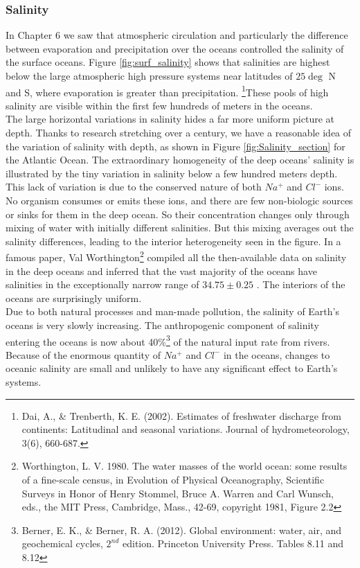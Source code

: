 \subsubsection{Salinity}
In Chapter 6 we saw that atmospheric circulation and particularly the difference between evaporation and precipitation over the oceans controlled the salinity of the surface oceans. Figure \ref{fig:surf_salinity}
shows that salinities are highest below the large atmospheric high pressure systems near latitudes of $25 \deg$ N and S, where evaporation is greater than precipitation. \footnote{Dai, A., \& Trenberth, K. E. (2002). Estimates of freshwater discharge from continents: Latitudinal and seasonal variations. Journal of hydrometeorology, 3(6), 660-687.}These pools of high salinity are visible within the first few hundreds of meters in the oceans.\\
The large horizontal variations in salinity hides a far more uniform picture at depth. Thanks to research stretching over a century, we have a reasonable idea of the variation of salinity with depth, as shown in Figure \ref{fig:Salinity_section} for the Atlantic Ocean. The extraordinary homogeneity of the deep oceans' salinity is illustrated by the tiny variation in salinity below a few hundred meters depth. This lack of variation is due to the conserved nature of both $Na^+$ and $Cl^-$ ions. No organism consumes or emits these ions, and there are few non-biologic sources or sinks for them in the deep ocean. So their concentration changes only through mixing of water with initially different salinities. But this mixing averages out the salinity differences, leading to the interior heterogeneity seen in the figure. In a famous paper, Val Worthington\footnote{Worthington, L. V. 1980. The water masses of the world ocean: some results of a fine-scale census, in Evolution of Physical Oceanography, Scientific Surveys in Honor of Henry Stommel, Bruce A. Warren and Carl Wunsch, eds., the MIT Press, Cambridge, Mass., 42-69, copyright 1981, Figure 2.2} compiled all the then-available data on salinity in the deep oceans and inferred that the vast majority of the oceans have salinities in the exceptionally narrow range of $34.75\pm 0.25$ \textperthousand. The interiors of the oceans are surprisingly uniform.\\ 
Due to both natural processes and man-made pollution, the salinity of Earth's oceans is very slowly increasing. The anthropogenic component of salinity entering the oceans is now about 40\%\footnote{Berner, E. K., \& Berner, R. A. (2012). Global environment: water, air, and geochemical cycles, $2^{nd}$ edition. Princeton University Press. Tables 8.11 and 8.12} of the natural input rate from rivers. Because of the enormous quantity of $Na^+$ and $Cl^-$ in the oceans, changes to oceanic salinity are small and unlikely to have any significant effect to Earth's systems. 
